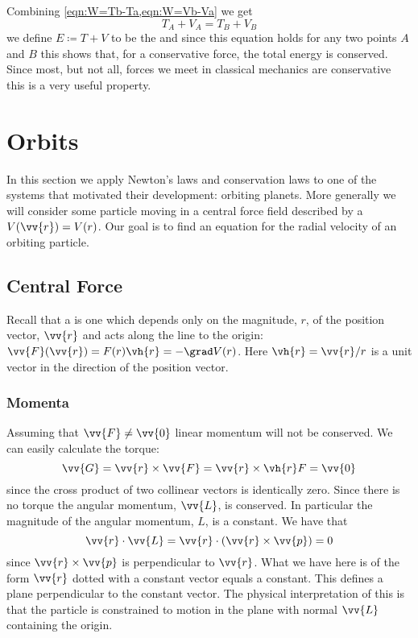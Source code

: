 \documentclass[fleqn]{NotesClass}
\begin{document}
    Combining \cref{eqn:W=Tb-Ta,eqn:W=Vb-Va} we get
    \begin{equation}
        T_A + V_A = T_B + V_B
    \end{equation}
    we define \(E \coloneqq T + V\) to be the  and since this equation holds for any two points \(A\) and \(B\) this shows that, for a conservative force, the total energy is conserved.
    Since most, but not all, forces we meet in classical mechanics are conservative this is a very useful property.
    
    \chapter{Orbits}
    In this section we apply Newton's laws and conservation laws to one of the systems that motivated their development: orbiting planets.
    More generally we will consider some particle moving in a central force field described by a  \(V(\vv{r}) = V(r)\).
    Our goal is to find an equation for the radial velocity of an orbiting particle.
    
    \section{Central Force}
    Recall that a  is one which depends only on the magnitude, \(r\), of the position vector, \(\vv{r}\) and acts along the line to the origin: \(\vv{F}(\vv{r}) = F(r)\vh{r} = -\grad V(r)\).
    Here \(\vh{r} = \vv{r}/r\) is a unit vector in the direction of the position vector.
    
    \subsection{Momenta}
    Assuming that \(\vv{F} \ne \vv{0}\) linear momentum will not be conserved.
    We can easily calculate the torque:
    \begin{equation}
        \vv{G} = \vv{r}\times\vv{F} = \vv{r}\times\vh{r}F = \vv{0}
    \end{equation}
    since the cross product of two collinear vectors is identically zero.
    Since there is no torque the angular momentum, \(\vv{L}\), is conserved.
    In particular the magnitude of the angular momentum, \(L\), is a constant.
    We have that
    \begin{equation}
        \vv{r}\cdot\vv{L} = \vv{r}\cdot(\vv{r}\times\vv{p}) = 0
    \end{equation}
    since \(\vv{r}\times\vv{p}\) is perpendicular to \(\vv{r}\).
    What we have here is of the form \(\vv{r}\) dotted with a constant vector equals a constant.
    This defines a plane perpendicular to the constant vector.
    The physical interpretation of this is that the particle is constrained to motion in the plane with normal \(\vv{L}\) containing the origin.
    
\end{document}
